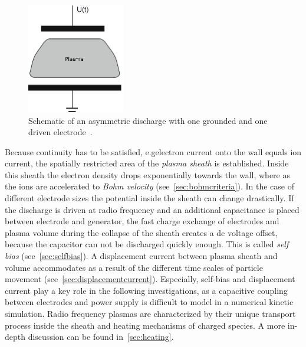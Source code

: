 %		
		\begin{figure}
			\centering
			\includegraphics[width=0.38\textwidth]{figures/circuitselfbias_1.png}
			\caption{%
				Schematic of an asymmetric discharge with one grounded and %
			one driven electrode~\cite{Piel10}.}\label{fig:circuitselfbias_1}
		\end{figure}
%
		 Because continuity has to be satisfied, e.g\@ electron current onto the wall equals ion current, the spatially restricted area of the \emph{plasma sheath} is established. Inside this sheath the electron density drops exponentially towards the wall, where as the ions are accelerated to \emph{Bohm velocity} (see~\autoref{sec:bohmcriteria}). In the case of different electrode sizes the potential inside the sheath can change drastically. If the discharge is driven at radio frequency and an additional capacitance is placed between electrode and generator, the fast charge exchange of electrodes and plasma volume during the collapse of the sheath creates a dc voltage offset, because the capacitor can not be discharged quickly enough. This is called \emph{self bias} (see~\autoref{sec:selfbias}). A displacement current between plasma sheath and volume accommodates as a result of the different time scales of particle movement (see~\autoref{sec:displacementcurrent}). Especially, self-bias and displacement current play a key role in the following investigations, as a capacitive coupling between electrodes and power supply is difficult to model in a numerical kinetic simulation. Radio frequency plasmas are characterized by their unique transport process inside the sheath and heating mechanisms of charged species. A more in-depth discussion can be found in~\autoref{sec:heating}.
